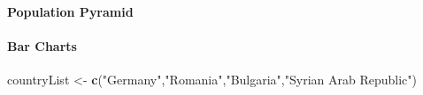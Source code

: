 \documentclass[
]{article}
\newenvironment{Shaded}{\begin{snugshade}}{\end{snugshade}}
\newcommand{\KeywordTok}[1]{\textcolor[rgb]{0.13,0.29,0.53}{\textbf{#1}}}
\newcommand{\NormalTok}[1]{#1}
\newcommand{\StringTok}[1]{\textcolor[rgb]{0.31,0.60,0.02}{#1}}
\let\oldparagraph\paragraph
\renewcommand{\paragraph}[1]{\oldparagraph{#1}\mbox{}}
\begin{document}
\hypertarget{population-pyramid}{%
\paragraph{Population Pyramid}\label{population-pyramid}}

\hypertarget{bar-charts}{%
\paragraph{Bar Charts}\label{bar-charts}}

\begin{Shaded}
\begin{Highlighting}[]
\NormalTok{countryList <-}\StringTok{ }\KeywordTok{c}\NormalTok{(}\StringTok{"Germany"}\NormalTok{,}\StringTok{"Romania"}\NormalTok{,}\StringTok{"Bulgaria"}\NormalTok{,}\StringTok{"Syrian Arab Republic"}\NormalTok{)}


\end{Highlighting}
\end{Shaded}
\end{document}
